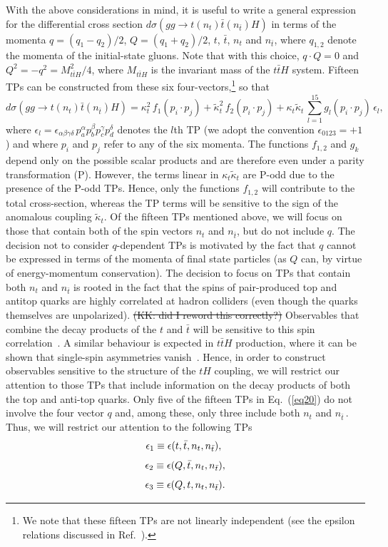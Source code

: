 \documentclass[aps,preprint,tightenlines,floatfix,superscriptaddress,nofootinbib,showpacs]{revtex4-1}
\def\beq{\begin{equation}}
\def\eeq{\end{equation}}
\def\tbar{\bar{t}}
\def\kp{\kappa_t}
\def\kpt{\tilde{\kappa}_t}
\providecommand{\DIFdel}[1]{{\protect\color{red}\sout{#1}}}                      %
\providecommand{\DIFdelbegin}{} %
\providecommand{\DIFdelend}{} %
\begin{document}
With the above considerations in mind, it is useful to
write a general expression for the differential cross
section $d\sigma(gg\to t(n_t)\tbar (n_{\tbar})H)$
in terms of the momenta $q=(q_1-q_2)/2$,
$Q=(q_1+q_2)/2$, $t$, $\bar{t}$, $n_t$ and $n_{\tbar}$, where
$q_{1,2}$ denote the momenta of the initial-state gluons. Note that with this
choice, $q\cdot Q=0$ and $Q^2=-q^2=M^2_{t\tbar H}/4$, where $M_{t\tbar
  H}$ is the invariant mass of the $t\tbar H$ system.
Fifteen TPs can be constructed from these six
four-vectors,\footnote{We note that these fifteen
  TPs are not linearly independent (see the epsilon relations
  discussed in Ref.~\cite{identities}).} so that
%
\beq
\label{eq20}
d\sigma(gg\to t(n_t)\tbar (n_{\tbar})H)= \kp^2\,f_1(p_i\cdot p_j)+\tilde{\kappa}^2_t\,f_2(p_i\cdot p_j)+\kp\kpt\,\sum^{15}_{l=1}g_l(p_i\cdot p_j)\,\epsilon_l,
\eeq   
%
where
$\epsilon_l=\epsilon_{\alpha\beta\gamma\delta}\,p^{\alpha}_ap^{\beta}_bp^{\gamma}_cp^{\delta}_d$
denotes the $l$th TP (we adopt the convention $\epsilon_{0123}=+1$) and where $p_i$ and $p_j$ refer to any of the
six momenta.  The
functions $f_{1,2}$ and $g_k$ depend only on the possible scalar
products and are therefore even under a parity transformation
($\mathrm{P}$). However, the terms linear in $\kp\kpt$ are
$\mathrm{P}$-odd due to the presence of the $\mathrm{P}$-odd
TPs. Hence, only the functions $f_{1,2}$ will contribute to the total
cross-section, whereas the TP terms will be sensitive to the sign of
the anomalous coupling $\kpt$. Of the fifteen TPs mentioned above,
we will focus on those that contain both of the spin
vectors $n_t$ and $n_{\tbar}$, but do not include $q$.
The decision not to consider $q$-dependent TPs is motivated by the fact
that $q$ cannot be expressed in terms of the momenta of final state
particles (as $Q$ can, by virtue of energy-momentum conservation). The
decision to focus on TPs that contain both $n_t$ and $n_{\tbar}$
is rooted in the fact that the spins of pair-produced top and antitop quarks
are highly correlated at hadron colliders 
(even though the quarks themselves are unpolarized).
\DIFdelbegin %
\DIFdel{(KK: did I reword
  this correctly?)}%
\DIFdelend Observables that combine the decay products of the
$t$ and $\tbar$ will be sensitive to this spin
correlation~\cite{Bernreuther}.  A similar behaviour is expected in $t\tbar H$
production, where it can be shown that single-spin asymmetries
vanish~\cite{Ellis,Biswas}. Hence, in order to construct observables
sensitive to the structure of the $tH$ coupling, we will restrict our attention
to those
TPs that include information on the decay products of both the top and
anti-top quarks. Only five of the fifteen TPs in Eq.~(\ref{eq20}) do
not involve the four vector $q$ and, among these, only three
include both $n_t$ and $n_{\tbar}\,$.  Thus, we will restrict our attention
to the following TPs
%
\beq
\label{eqa1}
\epsilon_1\equiv\epsilon(t,\tbar,n_t,n_{\tbar}),\,\,
\vspace*{1mm}
\eeq
%
\beq
\label{eqa2}
\epsilon_2\equiv\epsilon(Q,\tbar,n_t,n_{\tbar}),
\vspace*{1mm}
\eeq
%
\beq
\label{eqa3}
\epsilon_3\equiv\epsilon(Q,t,n_t,n_{\tbar}).
\vspace*{1mm}
\eeq
%
\par  
\end{document}
